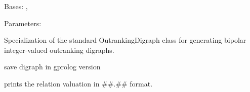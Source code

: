 \documentclass[letterpaper,10pt,english]{sphinxmanual}
\begin{document}
\begin{fulllineitems}
\label{techDoc:outrankingDigraphs.BipolarIntegerOutrankingDigraph}
Bases: {\hyperref[techDoc:outrankingDigraphs.BipolarOutrankingDigraph]{}}, {\hyperref[techDoc:perfTabs.PerformanceTableau]{}}
\begin{description}
\item[{Parameters:}] \leavevmode
{}

\end{description}

Specialization of the standard OutrankingDigraph class for generating
bipolar integer-valued outranking digraphs.

\begin{fulllineitems}
\label{techDoc:outrankingDigraphs.BipolarIntegerOutrankingDigraph.savePy2Gprolog}
save digraph in gprolog version

\end{fulllineitems}


\begin{fulllineitems}
\label{techDoc:outrankingDigraphs.BipolarIntegerOutrankingDigraph.showRelation}
prints the relation valuation in \#\#.\#\# format.

\end{fulllineitems}


\end{fulllineitems}

\end{document}
